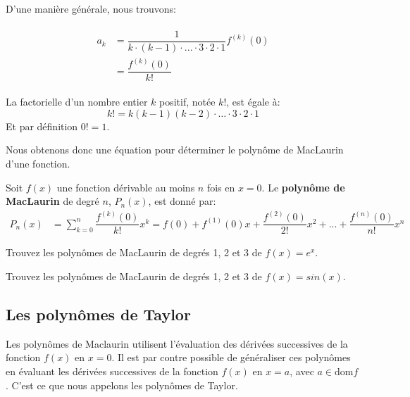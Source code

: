 \documentclass[]{book}
\theoremstyle{definition}
\theoremstyle{definition}
\theoremstyle{definition}
\theoremstyle{remark}
\let\BeginKnitrBlock\begin \let\EndKnitrBlock\end
\begin{document}
D'une manière générale, nous trouvons:

\begin{align}
\begin{split}
a_k &= \dfrac{1}{k\cdot (k-1)\cdot ...\cdot 3\cdot 2\cdot 1}f^{(k)}(0) \\
&= \dfrac{f^{(k)}(0)}{k!}
\end{split}
\end{align}

\BeginKnitrBlock{remark}[Factorielle]
{}La factorielle d'un nombre
entier \(k\) positif, notée \(k!\), est égale à: \begin{equation*}
k! = k(k-1)(k-2)\cdot\ldots\cdot 3\cdot 2\cdot 1
\end{equation*} Et par définition \(0!=1\).
\EndKnitrBlock{remark}

Nous obtenons donc une équation pour déterminer le polynôme de MacLaurin
d'une fonction.

\BeginKnitrBlock{definition}[Polynôme de MacLaurin]
\protect\hypertarget{def:unnamed-chunk-3}{}{\label{def:unnamed-chunk-3}
{} }Soit \(f(x)\) une fonction
dérivable au moins \(n\) fois en \(x=0\). Le \textbf{polynôme de
MacLaurin} de degré \(n\), \(P_n(x)\), est donné par: \begin{align*}
P_n(x)&=\sum_{k=0}^n\dfrac{f^{(k)}(0)}{k!}x^k=f(0)+f^{(1)}(0)x+\dfrac{f^{(2)}(0)}{2!}x^2+...+\dfrac{f^{(n)}(0)}{n!}x^n
\end{align*}
\EndKnitrBlock{definition}

\BeginKnitrBlock{example}
\protect\hypertarget{exm:unnamed-chunk-4}{}{\label{exm:unnamed-chunk-4}
}Trouvez les polynômes de MacLaurin de degrés 1, 2 et 3 de \(f(x)=e^x\).
\vspace*{8cm}
\EndKnitrBlock{example}

\BeginKnitrBlock{example}
\protect\hypertarget{exm:unnamed-chunk-5}{}{\label{exm:unnamed-chunk-5}
}Trouvez les polynômes de MacLaurin de degrés 1, 2 et 3 de
\(f(x)=sin(x)\). \vspace*{8cm}
\EndKnitrBlock{example}

\hypertarget{les-polynomes-de-taylor}{%
\subsection{Les polynômes de Taylor}\label{les-polynomes-de-taylor}}

Les polynômes de Maclaurin utilisent l'évaluation des dérivées
successives de la fonction \(f(x)\) en \(x=0\). Il est par contre
possible de généraliser ces polynômes en évaluant les dérivées
successives de la fonction \(f(x)\) en \(x=a\), avec
\(a\in \text{dom} f\). C'est ce que nous appelons les polynômes de
Taylor.
\end{document}
